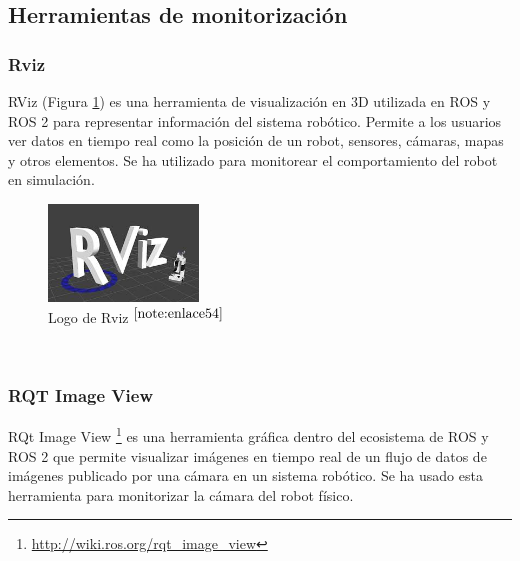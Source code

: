 \setcounter{footnote}{53} %

\subsection{Herramientas de monitorización}

\subsubsection{Rviz}

RViz (Figura \ref{fig:rviz}) es una herramienta de visualización en 3D utilizada en \acs{ROS} y \acs{ROS} 2 para representar información del sistema robótico. Permite a los usuarios ver datos en tiempo real como la posición de un robot, sensores, cámaras, mapas y otros elementos. Se ha utilizado para monitorear el comportamiento del robot en simulación.\\

\begin{figure} [h!]
	\begin{center}
		\includegraphics[width=4cm]{figs/rviz.png}
	\end{center}
	\caption{Logo de Rviz $^{\ref{note:enlace54}}$} 
	\label{fig:rviz}
\end{figure}\

\setcounter{footnote}{54} %

\subsubsection{RQT Image View}

RQt Image View \footnote{\url{http://wiki.ros.org/rqt_image_view}} es una herramienta gráfica dentro del ecosistema de \acs{ROS} y \acs{ROS} 2 que permite visualizar imágenes en tiempo real de un flujo de datos de imágenes publicado por una cámara en un sistema robótico. Se ha usado esta herramienta para monitorizar la cámara del robot físico.

